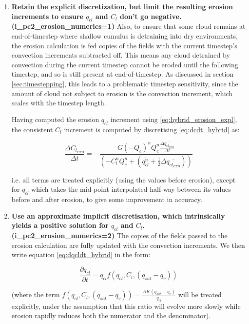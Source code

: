 \documentclass{UMDP_article}
\begin{document}
\begin{enumerate}

\item \textbf{Retain the explicit discretization, but limit the resulting
erosion increments to ensure $q_{cl}$ and $C_l$ don't go negative.
(i\_pc2\_erosion\_numerics=1)}
Also, to ensure that some cloud remains at end-of-timestep where
shallow cumulus is detraining into dry environments, the erosion
calculation is fed copies of the fields with the current timestep's
convection increments subtracted off.  This means any cloud detrained
by convection during the current timestep cannot be eroded until the
following timestep, and so is still present at end-of-timestep.
As discussed in section \ref{sec:timestepping},
this leads to a problematic timestep sensitivity,
since the amount of cloud not subject to erosion is the convection increment,
which scales with the timestep length.

Having computed the erosion $q_{cl}$ increment using
\ref{eq:hybrid_erosion_expl}, the consistent $C_l$ increment is computed
by discretising \ref{eq:dcdt_hybrid} as:

\begin{equation}
\frac{\Delta {C_l}_{ero}}{\Delta t}
 = - \frac{ G(-Q_c)^n Q_c^n \frac{\Delta \overline{{q_{cl}}_{ero}}}{\Delta t} }
          { (- C_l^n Q_c^n + ( \overline{q_{cl}^n}
                            + \frac{1}{2} \Delta \overline{{q_{cl}}_{ero}} ) ) }
\label{eq:dcdt_hybrid_discr}
\end{equation}

i.e. all terms are treated explicitly (using the values before erosion),
except for $\overline{q_{cl}}$ which takes the mid-point interpolated
half-way between its values before and after erosion,
to give some improvement in accuracy.

\item \textbf{Use an approximate implicit discretisation,
which intrinsically yields a positive solution for $q_{cl}$ and $C_l$.
(i\_pc2\_erosion\_numerics=2)}
The copies of the fields passed to the erosion calculation are
fully updated with the convection increments.
We then write equation \ref{eq:dqcldt_hybrid} in the form:

\[
\frac{\partial q_{cl}}{\partial t} = q_{cl} f(q_{cl},C_l,(q_{sat}-q_v))
\]

(where the term $f(q_{cl},C_l,(q_{sat}-q_v)) = \frac{A K(q_{sat}-q_v)}{q_{cl}}$
will be treated explicitly, under the assumption that this ratio will
evolve more slowly while erosion rapidly reduces both the numerator
and the denominator).


\end{enumerate}
\end{document}
